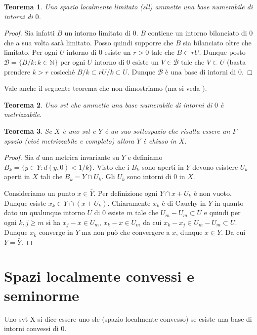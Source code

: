 \documentclass[italian,a4paper,oneside,headinclude]{scrbook}
\newcommand{\B}{\mathcal B}
\newcommand{\NN}{\mathbb N}
\newtheorem{theorem}{Teorema}
\begin{document}
\begin{theorem}\cite[1.15]{Rudin}
  Uno spazio localmente limitato (sll) ammette una base numerabile di
  intorni di $0$.
\end{theorem}
\begin{proof}
  Sia infatti $B$ un intorno limitato di $0$. $B$ contiene un intorno
  bilanciato di $0$ che a sua volta sarà limitato. Posso quindi
  supporre che $B$ sia bilanciato oltre che limitato.
  Per ogni $U$ intorno di
  $0$ esiste un $r>0$ tale che $B\subset r U$. Dunque posto  $\B = \{
  B/k\colon k\in \NN\}$ per ogni $U$ intorno di $0$ esiste un $V\in\B$
  tale che $V\subset U$ (basta prendere $k>r$ cosicché $B/k \subset r
  U /k \subset U$. Dunque $\B$ è una base di intorni di $0$.
\end{proof}

Vale anche il seguente teorema che non dimostriamo (ma si veda \cite[1.24]{Rudin}).

\begin{theorem}
  Uno svt che ammette una base numerabile di intorni di $0$ è metrizzabile.
\end{theorem}

\begin{theorem}
Se $X$ è uno svt e $Y$ è un suo sottospazio
che risulta essere un $F$-spazio (cioè metrizzabile e completo) allora
$Y$ è chiuso in $X$.
\end{theorem}
\begin{proof}
  Sia $d$ una metrica invariante su $Y$ e definiamo
  $B_k=\{ y\in Y\colon d(y,0) < 1/k\}$. Visto che i $B_k$ sono aperti
  in $Y$ devono esistere $U_k$ aperti in $X$ tali che
  $B_k=Y\cap U_k$. Gli $U_k$ sono intorni di $0$ in $X$.

  Consideriamo un punto $x\in \bar Y$. Per definizione ogni
  $Y\cap x+U_k$ è non vuoto.
  Dunque esiste $x_k \in Y\cap (x+U_k)$. Chiaramente $x_k$ è di Cauchy
  in $Y$ in quanto dato un qualunque intorno $U$ di $0$ esiste $m$
  tale che
  $U_m-U_m\subset U$ e quindi per ogni $k,j\ge m$ si ha $x_j-x \in
  U_m$, $x_k-x \in U_m$ da cui $x_k-x_j\in U_m -U_m \subset U$.
  Dunque $x_k$ converge in $Y$ ma non può che convergere a $x$, dunque
  $x\in Y$. Da cui $Y=\bar Y$.
\end{proof}

\section{Spazi localmente convessi e seminorme}

Uno svt X si dice essere uno slc (spazio localmente convesso) se
esiste una base di intorni convessi di $0$.
\end{document}
